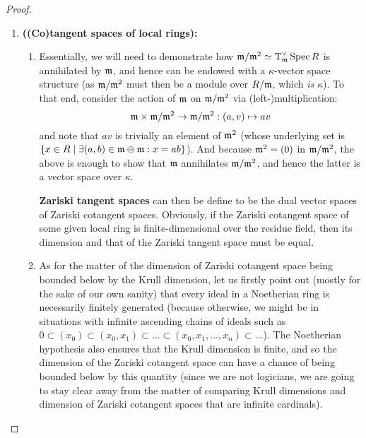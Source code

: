                 \begin{proof}
                    \noindent
                    \begin{enumerate}
                        \item \textbf{\textbf{((Co)tangent spaces of local rings):}} 
                            \begin{enumerate}
                                \item Essentially, we will need to demonstrate how $\mathfrak{m}/\mathfrak{m}^2 \simeq \operatorname{T}^{\vee}_{\mathfrak{m}}\operatorname{Spec} R$ is annihilated by $\mathfrak{m}$, and hence can be endowed with a $\kappa$-vector space structure (as $\mathfrak{m}/\mathfrak{m}^2$ must then be a module over $R/\mathfrak{m}$, which \textit{is} $\kappa$). To that end, consider the action of $\mathfrak{m}$ on $\mathfrak{m}/\mathfrak{m}^2$ via (left-)multiplication:
                                    $$\m \x \m/\m^2 \to \m/\m^2: (a, v) \mapsto av$$
                                and note that $av$ is trivially an element of $\mathfrak{m}^2$ (whose underlying set is $\{x \in R \mid \exists (a, b) \in \mathfrak{m} \oplus \mathfrak{m}: x = ab\}$). And because $\mathfrak{m}^2 = (0)$ in $\mathfrak{m}/\mathfrak{m}^2$, the above is enough to show that $\mathfrak{m}$ annihilates $\mathfrak{m}/\mathfrak{m}^2$, and hence the latter is a vector space over $\kappa$. 
                                
                                \textbf{Zariski tangent spaces} can then be define to be the dual vector spaces of Zariski cotangent spaces. Obviously, if the Zariski cotangent space of some given local ring is finite-dimensional over the residue field, then its dimension and that of the Zariski tangent space must be equal.
                                
                                \item As for the matter of the dimension of Zariski cotangent space being bounded below by the Krull dimension, let us firstly point out (mostly for the sake of our own sanity) that every ideal in a Noetherian ring is necessarily finitely generated (because otherwise, we might be in situations with infinite ascending chains of ideals such as $0 \subset (x_0) \subset (x_0, x_1) \subset ... \subset (x_0, x_1, ..., x_n) \subset ...$). The Noetherian hypothesis also ensures that the Krull dimension is finite, and so the dimension of the Zariski cotangent space can have a chance of being bounded below by this quantity (since we are not logicians, we are going to stay clear away from the matter of comparing Krull dimensions and dimension of Zariski cotangent spaces that are infinite cardinals).
                                

\end{enumerate}
\end{enumerate}
\end{proof}
